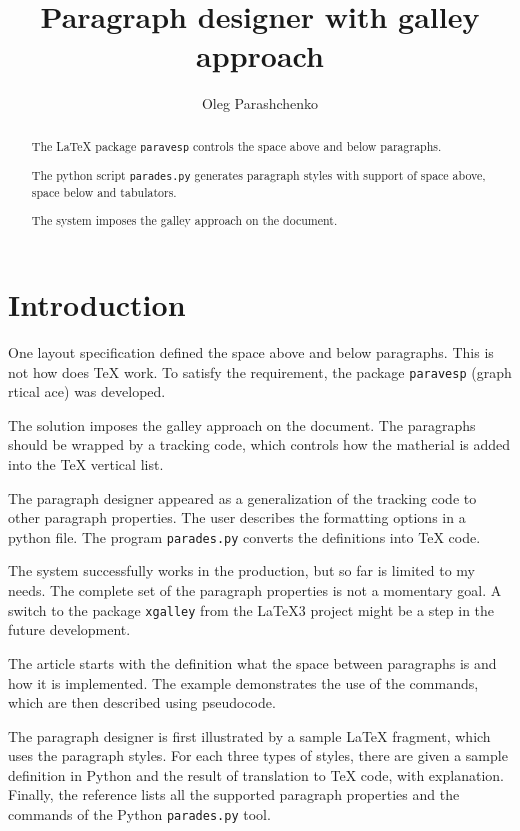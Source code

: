 \documentclass[]{ltugboat}
\begin{document}
\title{Paragraph designer with galley approach}
\author{Oleg Parashchenko}
\address{bitplant.de GmbH\\
Fabrikstr. 15\\
89520 Heidenheim, Germany}
\maketitle

\begin{abstract}
The \LaTeX{} package \verb|paravesp| controls the space above and below paragraphs.

The python script \verb|parades.py| generates paragraph styles with support of space above, space below and tabulators.

The system imposes the galley approach on the document.
\end{abstract}

\section{Introduction}

One layout specification defined the space above and below paragraphs. This is not how does \TeX{} work. To satisfy the requirement, the package \verb|paravesp| (graph rtical ace) was developed.

The solution imposes the galley approach on the document. The paragraphs should be wrapped by a tracking code, which controls how the matherial is added into the \TeX{} vertical list.

The paragraph designer appeared as a generalization of the tracking code to other paragraph properties. The user describes the formatting options in a python file. The program \verb|parades.py| converts the definitions into \TeX{} code.

The system successfully works in the production, but so far is limited to my needs. The complete set of the paragraph properties is not a momentary goal. A switch to the package \verb|xgalley| from the \LaTeX{}3 project might be a step in the future development.

The article starts with the definition what the space between paragraphs is and how it is implemented. The example demonstrates the use of the commands, which are then described using pseudocode.

The paragraph designer is first illustrated by a sample \LaTeX{} fragment, which uses the paragraph styles. For each three types of styles, there are given a sample definition in Python and the result of translation to \TeX{} code, with explanation. Finally, the reference lists all the supported paragraph properties and the commands of the Python \verb|parades.py| tool.
\end{document}

